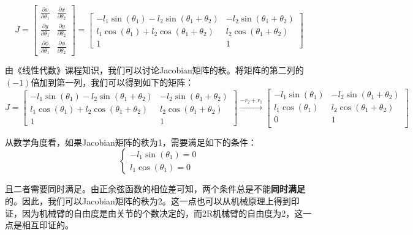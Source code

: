 \documentclass{ctexart}
\begin{document}
\begin{equation}
	J = \begin{bmatrix}
		\frac{\partial x}{\partial \theta_1} & \frac{\partial x}{\partial \theta_2} \\
		\frac{\partial y}{\partial \theta_1} & \frac{\partial y}{\partial \theta_2} \\
		\frac{\partial \phi}{\partial \theta_1} & \frac{\partial \phi}{\partial \theta_2}
	\end{bmatrix} = \begin{bmatrix}
		-l_1 \sin(\theta_1) - l_2 \sin(\theta_1 + \theta_2) & -l_2 \sin(\theta_1 + \theta_2) \\
		l_1 \cos(\theta_1) + l_2 \cos(\theta_1 + \theta_2) & l_2 \cos(\theta_1 + \theta_2) \\
		1 & 1
	\end{bmatrix}
\end{equation}

由《线性代数》课程知识，我们可以讨论Jacobian矩阵的秩。将矩阵的第二列的$(-1)$倍加到第一列，我们可以得到如下的矩阵：
\begin{equation}
	J = \begin{bmatrix}
		-l_1 \sin(\theta_1) - l_2 \sin(\theta_1 + \theta_2) & -l_2 \sin(\theta_1+\theta_2) \\
		l_1 \cos(\theta_1) + l_2 \cos(\theta_1 + \theta_2) & l_2 \cos(\theta_1+\theta_2) \\
		1 & 1
	\end{bmatrix}
	\stackrel{\text{$-r_2+r_1$}}{\longrightarrow}
	\begin{bmatrix}
		-l_1 \sin(\theta_1) & -l_2\sin(\theta_1+\theta_2)\\
		l_1  \cos(\theta_1) &l_2 \cos(\theta_1+\theta_2) \\
		0 & 1\\
	\end{bmatrix}
\end{equation}

从数学角度看，如果Jacobian矩阵的秩为1，需要满足如下的条件：
\begin{equation}
	\left\{\begin{array}{c}
		-l_1 \sin(\theta_1) = 0 \\
		l_1 \cos(\theta_1) = 0
	\end{array}\right.
\end{equation}

且二者需要同时满足。由正余弦函数的相位差可知，两个条件总是不能\textbf{同时满足}的。因此，我们可以Jacobian矩阵的秩为2。这一点也可以从机械原理上得到印证，因为机械臂的自由度是由关节的个数决定的，而2R机械臂的自由度为2，这一点是相互印证的。
\end{document}
